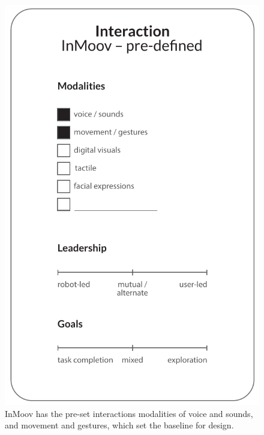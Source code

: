 \begin{figure}
\centering
  \includegraphics[scale=0.75]{images/solution_inmoov_predefined-03.pdf}
  \caption{InMoov has the pre-set interactions modalities of voice and sounds, and movement and gestures, which set the baseline for design.}
  \label{fig:interactionPredefined}
\end{figure}

